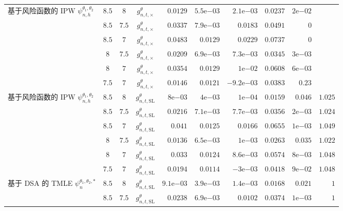 \begin{longtable}{@{}p{2.55cm}cccrrrrrr@{}}
\midrule
\shortstack[l]{基于风险函数的 IPW\\$\psi^{\theta_1,\theta_2}_{n,h}$} & $8.5$ & $8$ & $g^\theta_{n,t,\times}$ & $0.0129$ & $5.5\mathrm e{-03}$ & $2.1\mathrm e{-03}$ & $0.0237$ & $2\mathrm e{-02}$ & \\
 & $8.5$ & $7.5$ & $g^\theta_{n,t,\times}$ & $0.0337$ & $7.9\mathrm e{-03}$ & $0.0183$ & $0.0491$ & $0$ & \\
 & $8.5$ & $7$ & $g^\theta_{n,t,\times}$ & $0.0483$ & $0.0129$ & $0.0229$ & $0.0737$ & $0$ & \\
 & $8$ & $7.5$ & $g^\theta_{n,t,\times}$ & $0.0209$ & $6.9\mathrm e{-03}$ & $7.3\mathrm e{-03}$ & $0.0345$ & $3\mathrm e{-03}$ & \\
 & $8$ & $7$ & $g^\theta_{n,t,\times}$ & $0.0354$ & $0.0129$ & $1\mathrm e{-02}$ & $0.0608$ & $6\mathrm e{-03}$ & \\
 & $7.5$ & $7$ & $g^\theta_{n,t,\times}$ & $0.0146$ & $0.0121$ & $-9.2\mathrm e{-03}$ & $0.0383$ & $0.23$ & \\
\midrule
\shortstack[l]{基于风险函数的 IPW\\$\psi^{\theta_1,\theta_2}_{n,h}$} & $8.5$ & $8$ & $g^\theta_{n,t,\mathrm{SL}}$ & $8\mathrm e{-03}$ & $4\mathrm e{-03}$ & $1\mathrm e{-04}$ & $0.0159$ & $0.046$ & $1.025$\\
 & $8.5$ & $7.5$ & $g^\theta_{n,t,\mathrm{SL}}$ & $0.0216$ & $7.1\mathrm e{-03}$ & $7.7\mathrm e{-03}$ & $0.0356$ & $2\mathrm e{-03}$ & $1.024$\\
 & $8.5$ & $7$ & $g^\theta_{n,t,\mathrm{SL}}$ & $0.041$ & $0.0125$ & $0.0166$ & $0.0655$ & $1\mathrm e{-03}$ & $1.049$\\
 & $8$ & $7.5$ & $g^\theta_{n,t,\mathrm{SL}}$ & $0.0136$ & $6.5\mathrm e{-03}$ & $1\mathrm e{-03}$ & $0.0263$ & $0.035$ & $1.022$\\
 & $8$ & $7$ & $g^\theta_{n,t,\mathrm{SL}}$ & $0.033$ & $0.0124$ & $8.6\mathrm e{-03}$ & $0.0574$ & $8\mathrm e{-03}$ & $1.048$\\
 & $7.5$ & $7$ & $g^\theta_{n,t,\mathrm{SL}}$ & $0.0194$ & $0.0114$ & $-3\mathrm e{-03}$ & $0.0418$ & $9\mathrm e{-02}$ & $1.048$\\
\midrule
\shortstack[l]{基于 DSA 的 TMLE\\$\psi^{\theta_1,\theta_2,*}_{n}$} & $8.5$ & $8$ & $g^\theta_{n,t,\mathrm{SL}}$ & $9.1\mathrm e{-03}$ & $3.9\mathrm e{-03}$ & $1.4\mathrm e{-03}$ & $0.0168$ & $0.021$ & $1$\\
 & $8.5$ & $7.5$ & $g^\theta_{n,t,\mathrm{SL}}$ & $0.0238$ & $6.9\mathrm e{-03}$ & $0.0102$ & $0.0374$ & $1\mathrm e{-03}$ & $1$\\

\end{longtable}

